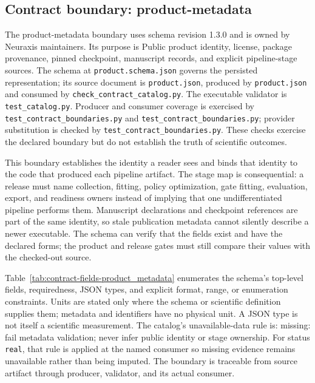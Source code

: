 \subsection{Contract boundary: product-metadata}\label{sec:contract-product_metadata}
The product-metadata boundary uses schema revision 1.3.0 and is owned by Neuraxis maintainers. Its purpose is Public product identity, license, package provenance, pinned checkpoint, manuscript records, and explicit pipeline-stage sources. The schema at \texttt{product.schema.json} governs the persisted representation; its source document is \texttt{product.json}, produced by \texttt{product.json} and consumed by \texttt{check\_\allowbreak{}contract\_\allowbreak{}catalog.py}. The executable validator is \texttt{test\_\allowbreak{}catalog.py}. Producer and consumer coverage is exercised by \texttt{test\_\allowbreak{}contract\_\allowbreak{}boundaries.py} and \texttt{test\_\allowbreak{}contract\_\allowbreak{}boundaries.py}; provider substitution is checked by \texttt{test\_\allowbreak{}contract\_\allowbreak{}boundaries.py}. These checks exercise the declared boundary but do not establish the truth of scientific outcomes.

This boundary establishes the identity a reader sees and binds that identity to the code that produced each pipeline artifact. The stage map is consequential: a release must name collection, fitting, policy optimization, gate fitting, evaluation, export, and readiness owners instead of implying that one undifferentiated pipeline performs them. Manuscript declarations and checkpoint references are part of the same identity, so stale publication metadata cannot silently describe a newer executable. The schema can verify that the fields exist and have the declared forms; the product and release gates must still compare their values with the checked-out source.

Table~\ref{tab:contract-fields-product_metadata} enumerates the schema's top-level fields, requiredness, JSON types, and explicit format, range, or enumeration constraints. Units are stated only where the schema or scientific definition supplies them; metadata and identifiers have no physical unit. A JSON type is not itself a scientific measurement. The catalog's unavailable-data rule is: missing: fail metadata validation; never infer public identity or stage ownership. For status \texttt{real}, that rule is applied at the named consumer so missing evidence remains unavailable rather than being imputed. The boundary is traceable from source artifact through producer, validator, and its actual consumer.

